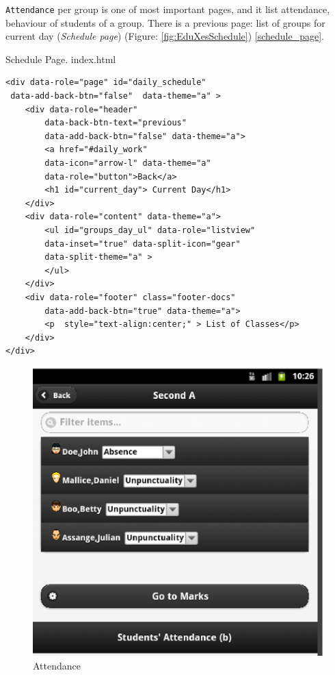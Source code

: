 \texttt{Attendance} per group is one of most important pages, and it list attendance, behaviour of 
students of a group. There is a previous page: list of groups for current day (\textit{Schedule page})
(Figure: \ref{fig:EduXesSchedule}) \ref{schedule_page}.

\begin{bclogo}[couleur=blue!30,arrondi=0.1,ombre=true ] 
{Schedule Page. index.html \label{schedule_page}}
\begin{verbatim}
<div data-role="page" id="daily_schedule"  
 data-add-back-btn="false"  data-theme="a" >
    <div data-role="header"  
        data-back-btn-text="previous" 
        data-add-back-btn="false" data-theme="a">
        <a href="#daily_work"  
        data-icon="arrow-l" data-theme="a" 
        data-role="button">Back</a>
        <h1 id="current_day"> Current Day</h1>
    </div>
    <div data-role="content" data-theme="a">
        <ul id="groups_day_ul" data-role="listview" 
        data-inset="true" data-split-icon="gear"  
        data-split-theme="a" >
        </ul>
    </div>
    <div data-role="footer" class="footer-docs" 
        data-add-back-btn="true" data-theme="a">
        <p  style="text-align:center;" > List of Classes</p>
    </div>
</div>
\end{verbatim}
\end{bclogo}

\begin{figure}
    \begin{center}
        \includegraphics{eduxes_students_attendance2.eps}
        \caption{Attendance}
        \label{fig:EduXesAttendance}
    \end{center}
\end{figure}

